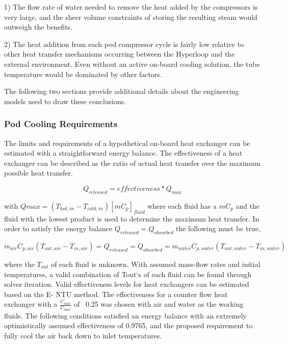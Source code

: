 \documentclass[heading.tex]{subfiles}
\begin{document}
1) The flow rate of water needed to remove the heat added by the compressors is very large, and the sheer volume constraints of storing
the resulting steam would outweigh the benefits.

2) The heat addition from each pod compressor cycle is fairly low relative to other heat transfer mechanisms occurring between the Hyperloop
and the external environment. Even without an active on-board cooling solution, the tube temperature would be dominated by other factors.

The following two sections provide additional details about the engineering models used to draw these conclusions.

\subsubsection{Pod Cooling Requirements}

The limits and requirements of a hypothetical on-board heat exchanger can be estimated with a straightforward energy balance. The
effectiveness of a heat exchanger can be described as the ratio of actual heat transfer over the maximum possible heat transfer.

\begin{equation*}
{Q}_{released}  = effectiveness * {Q}_{max}
\end{equation*}


with $Qmax=\left(T_{hot,in} - T_{cold,in}\right) [ \dot{m} C_{p} ]_{fluid}$ where each fluid has a $\dot{m} C_{p}$ and the fluid with the lowest
product is used to determine the maximum heat transfer. In order to satisfy the energy balance $Q_{released}=Q_{absorbed}$ the following must be true,

\begin{equation*}
\dot{m}_{air} C_{p, air} (T_{out, air} - T_{in, air}) = {Q}_{released} = {Q}_{absorbed}= \dot{m}_{water} C_{p,water} (T_{out, water} - T_{in, water})
\end{equation*}

where the $T_{out}$  of each fluid is unknown. With assumed mass-flow rates and initial temperatures, a valid combination of Tout‘s of
each fluid can be found through solver iteration. Valid effectiveness levels for heat exchangers can be estimated based on the E- NTU
method. The effectiveness for a counter flow heat exchanger with a $\frac{C_{min}}{C_{max}}$ of ~0.25 was chosen with air and water as the working fluids. 
The following conditions satisfied an energy balance with an extremely optimistically assumed effectiveness of 0.9765, and the proposed requirement to fully
cool the air back down to inlet temperatures.
\end{document}
